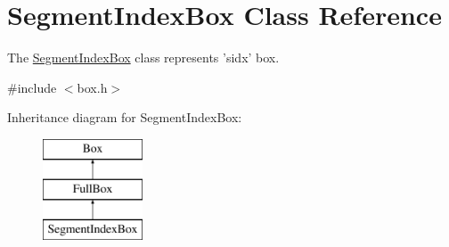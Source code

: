 \hypertarget{class_segment_index_box}{\section{Segment\-Index\-Box Class Reference}
\label{class_segment_index_box}
}


The \hyperlink{class_segment_index_box}{Segment\-Index\-Box} class represents 'sidx' box.  




{\ttfamily \#include $<$box.\-h$>$}

Inheritance diagram for Segment\-Index\-Box\-:\begin{figure}[H]
\begin{center}
\leavevmode
\includegraphics[height=3.000000cm]{class_segment_index_box}
\end{center}
\end{figure}
